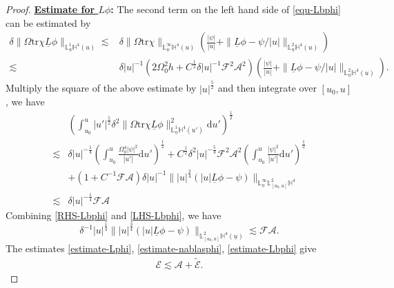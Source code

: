 \documentclass[11pt,reqno]{amsart}
\theoremstyle{definition}
\numberwithin{equation}{section}
\newcommand{\D}{\mathrm{d}}
\newcommand{\tr}{\mathrm{tr}}
\renewcommand{\L}{\mathbb{L}}
\renewcommand{\H}{\mathbb{H}}
\def\Lb{\underline{L}}
\def\tr{\mathrm{tr}}
\def\ub{\underline{u}}
\begin{document}
\begin{proof}  {\bf \underline{Estimate for $L\phi$}:}
The second term on the left hand side of \eqref{equ-Lbphi} can be estimated by
\begin{align*}
\delta\|\Omega\tr\chi\Lb\phi\|_{\L^1_{\ub}{\H^4(u)}}\lesssim&\delta\|\Omega\tr\chi\|_{\L^\infty_{\ub}\H^4(u)}\left(\frac{|\psi|}{|u|}+\|\Lb\phi-\psi/|u|\|_{\L^2_{\ub}\H^4(u)}\right)\\
\lesssim&\delta|u|^{-1}(2\Omega_0^2h+C^{\frac{1}{2}}\delta|u|^{-1}\mathscr{F}^2\mathcal{A}^2)\left(\frac{|\psi|}{|u|}+\|\Lb\phi-\psi/|u|\|_{\L^2_{\ub}\H^4(u)}\right).
\end{align*}
Multiply the square of the above estimate by $|u|^{\frac{5}{2}}$ and then integrate over $[u_0,u]$, we have
\begin{equation}\label{LHS-Lbphi}
\begin{split}
&\left(\int_{u_0}^u|u'|^{\frac{5}{2}}\delta^2\|\Omega\tr\chi\Lb\phi\|^2_{\L^1_{\ub}{\H^4(u')}}\D u'\right)^{\frac{1}{2}}\\
\lesssim&\delta|u|^{-\frac{1}{4}}\left(\int_{u_0}^u\frac{\Omega_0^4|\psi|^2}{|u'|}\D u'\right)^{\frac{1}{2}}+C^{\frac{1}{2}}\delta^2|u|^{-\frac{5}{4}}\mathscr{F}^2\mathcal{A}^2\left(\int_{u_0}^u\frac{|\psi|^2}{|u'|}\D u'\right)^{\frac{1}{2}}\\
&+(1+C^{-1}\mathscr{F}\mathcal{A})\delta|u|^{-1}\||u|^{\frac{3}{4}}(|u|\Lb\phi-\psi)\|_{\L^\infty_{\ub}\L^2_{[u_0,u]}\H^4}\\
\lesssim&\delta|u|^{-\frac{1}{4}}\mathscr{F}\mathcal{A}
\end{split}
\end{equation}
Combining \eqref{RHS-Lbphi} and \eqref{LHS-Lbphi}, we have
\begin{equation}\label{estimate-Lbphi}
\delta^{-1}|u|^{\frac{1}{4}}\||u|^{\frac{3}{4}}(|u|\Lb \phi-\psi)\|_{\L^2_{[u_0,u]}\H^4(\ub)}\lesssim \mathscr{F}\mathcal{A}.
\end{equation}
The estimates \eqref{estimate-Lphi}, \eqref{estimate-nablasphi}, \eqref{estimate-Lbphi} give
\begin{align*}
\mathcal{E}\lesssim\mathcal{A}+\widetilde{\mathcal{E}}.
\end{align*}

\end{proof}
\end{document}
